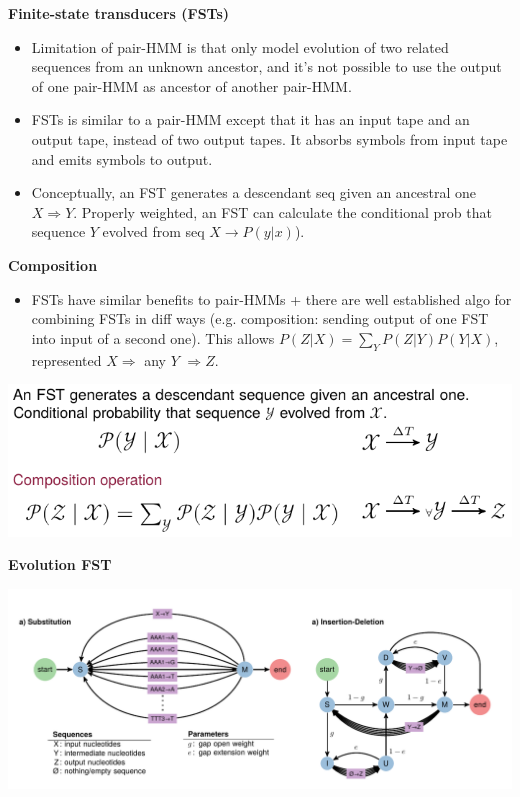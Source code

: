 \textbf{Finite-state transducers (FSTs)}
    \begin{itemize}
    \item Limitation of pair-HMM is that only model evolution of
        two related sequences from an unknown ancestor, and it's
        not possible to use the output of one pair-HMM as ancestor
        of another pair-HMM.
    \item FSTs is similar to a pair-HMM except that it has an input
        tape and an output tape, instead of two output tapes. It
        absorbs symbols from input tape and emits symbols to output.
    \item Conceptually, an FST generates a descendant seq given
        an ancestral one $X \Rightarrow Y$. Properly weighted,
        an FST can calculate the conditional prob that sequence
        $Y$ evolved from seq $X \rightarrow P(y|x)$).
    \end{itemize}

\textbf{Composition}
    \begin{itemize}
    \item FSTs have similar benefits to pair-HMMs + there are
        well established algo for combining FSTs in diff ways
        (e.g. composition: sending output of one FST into input
        of a second one). This allows $P(Z|X) = \sum_Y P(Z|Y) P(Y|X)$,
        represented $X \Rightarrow$ any $Y$ $\Rightarrow Z$.
    \end{itemize}
    \begin{center}
    \includegraphics[scale=1]{figures/fig-fst.pdf}
    \end{center}

\textbf{Evolution FST}
    \begin{center}
        \hspace*{-2cm}\includegraphics[width=\textwidth]{figures/fig-evolution-fst.pdf}
    \end{center}

